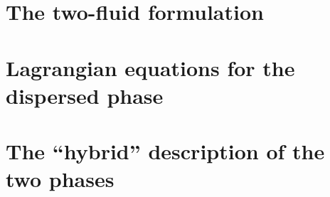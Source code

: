 \documentclass[11pt]{My_preprint}
\begin{document}





\section{The two-fluid formulation}
\label{sec:two-fluid}



\section{Lagrangian equations for the dispersed phase}
\label{sec:Lagrangian}



\section{The ``hybrid'' description of the two phases}
\label{sec:averaged_eq}


% 

% 
% 
% 
% 
% 
\end{document}

